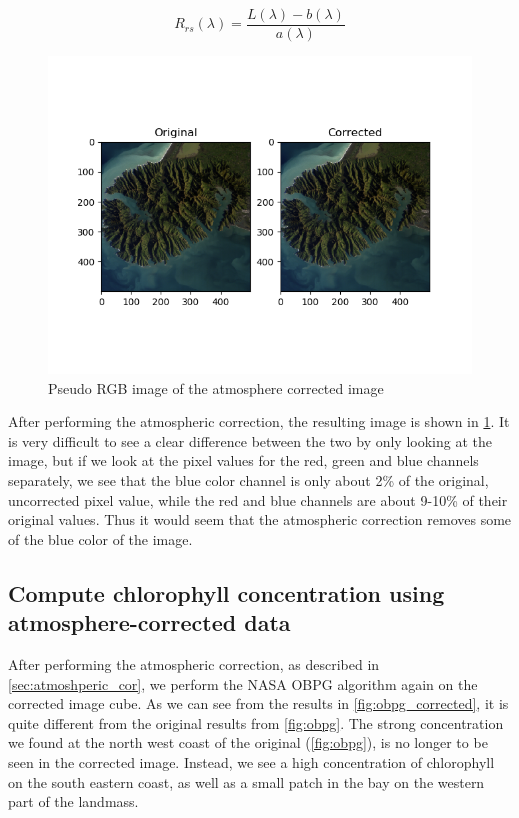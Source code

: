 \begin{equation}
    \label{eq:R_rs}
    R_{rs}(\lambda) = \frac{L(\lambda) - b(\lambda)}{a(\lambda)}
\end{equation}

\begin{figure}
    \centering
    \includegraphics[width=\textwidth]{../fig/pseudo_rgb_corrected.png}
    \caption{Pseudo RGB image of the atmosphere corrected image}
    \label{fig:RGB_corrected}
\end{figure}

After performing the atmospheric correction, the resulting image is shown in 
\cref{fig:RGB_corrected}. It is very difficult to see a clear difference between 
the two by only looking at the image, but if we look at the pixel values for the red, 
green and blue channels separately, we see that the blue color channel is only about 2\% 
of the original, uncorrected pixel value, while the red and blue channels are about 9-10\% 
of their original values. Thus it would seem that the atmospheric correction removes some of 
the blue color of the image. 

\subsection{Compute chlorophyll concentration using atmosphere-corrected data}

After performing the atmospheric correction, as described in \cref{sec:atmoshperic_cor}, 
we perform the NASA OBPG algorithm again on the corrected image cube. As we can 
see from the results in \cref{fig:obpg_corrected}, it is quite different from the 
original results from \cref{fig:obpg}. The strong concentration we found at the north 
west coast of the original (\cref{fig:obpg}), is no longer to be seen in the corrected 
image. Instead, we see a high concentration of chlorophyll on the south eastern coast, 
as well as a small patch in the bay on the western part of the landmass. 


